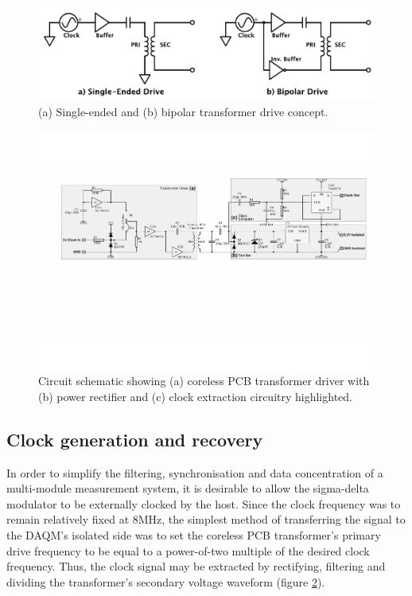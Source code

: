 \documentclass[conference]{IEEEtran}
\begin{document}
	\begin{figure}[t]
		\centering
		\includegraphics[width=1\columnwidth]{./img/BIvsSE}
		\caption{(a) Single-ended and (b) bipolar transformer drive concept.}
		\label{fig:BIvsSE}
	\end{figure}
%	
	\begin{figure}[t]
		\centering
		\includegraphics[width=1.0\textwidth]{./img/TFpwrclk_BW}
		\caption{Circuit schematic showing (a) coreless PCB transformer driver with (b) power rectifier and (c) clock extraction circuitry highlighted.}
		\label{fig:TFpwrclk}
	\end{figure}	
	
	\subsection{Clock generation and recovery}
	In order to simplify the filtering, synchronisation and data concentration of a multi-module measurement system, it is desirable to allow the sigma-delta modulator to be externally clocked by the host.  Since the clock frequency was to remain relatively fixed at 8MHz, the simplest method of transferring the signal to the DAQM's isolated side was to set the coreless PCB transformer's primary drive frequency to be equal to a power-of-two multiple of the desired clock frequency.  Thus, the clock signal may be extracted by rectifying, filtering and dividing the transformer's secondary voltage waveform (figure \ref{fig:TFpwrclk}).
	
\end{document}
